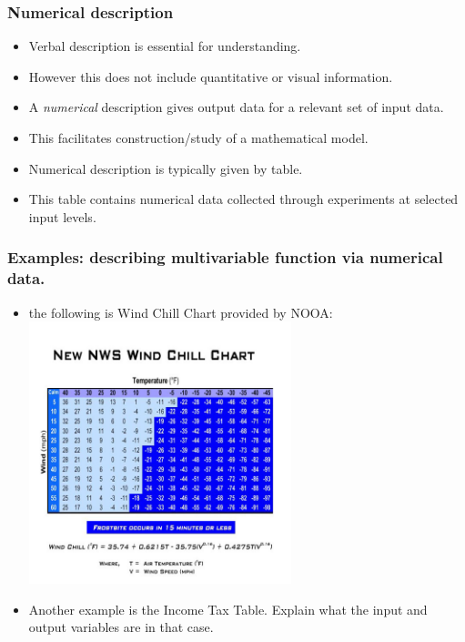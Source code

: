 \begin{frame}
\frametitle{Numerical description}
\begin{itemize}
\item Verbal description is essential for understanding.
\item<2-> However this does not include quantitative or visual information.
\item<3-> A \emph{numerical} description gives output data for a relevant set of input data.
\item<4-> This facilitates construction/study of a mathematical model.
\item<5-> Numerical description is typically given by table.
\item<6-> This table contains numerical data collected through experiments at selected input levels. 
\end{itemize}
\end{frame}

\begin{frame}
\frametitle{Examples: describing multivariable function via numerical data.}
\begin{itemize}
\item the following is Wind Chill Chart provided by NOOA:
\includegraphics[width=3in]{../../modules/multivariable-functions/pictures/windchill2.jpg}
\end{itemize}
\end{frame}
\begin{frame}
\begin{itemize}
\item Another example is the Income Tax Table. Explain what the
input and output variables are in that case.
\end{itemize}
\end{frame}
